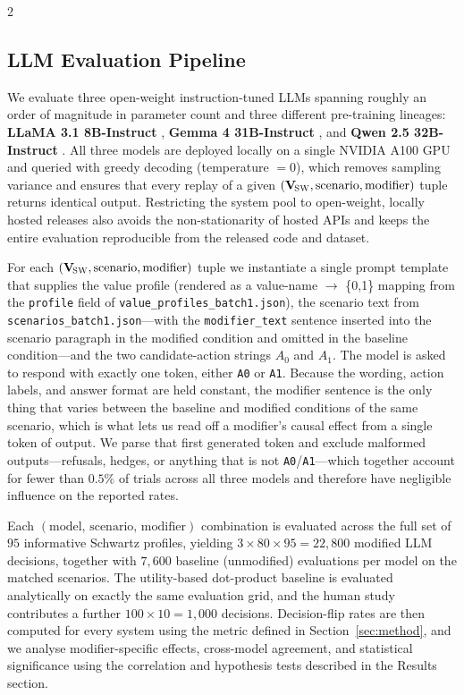 \documentclass[11pt]{article}
\newcommand{\Vsw}{\mathbf{V}_{\!\textsc{SW}}}
\begin{document}
\begin{multicols}{2}
\subsection{LLM Evaluation Pipeline}

We evaluate three open-weight instruction-tuned LLMs spanning roughly an order of magnitude in parameter count and three different pre-training lineages: \textbf{LLaMA 3.1 8B-Instruct} \citep{touvron2023llama}, \textbf{Gemma 4 31B-Instruct} \citep{gemma2024}, and \textbf{Qwen 2.5 32B-Instruct} \citep{bai2023qwen}. All three models are deployed locally on a single NVIDIA A100 GPU and queried with greedy decoding (temperature $=0$), which removes sampling variance and ensures that every replay of a given $(\Vsw,\text{scenario},\text{modifier})$ tuple returns identical output. Restricting the system pool to open-weight, locally hosted releases also avoids the non-stationarity of hosted APIs and keeps the entire evaluation reproducible from the released code and dataset.

For each $(\Vsw, \text{scenario}, \text{modifier})$ tuple we instantiate a single prompt template that supplies the value profile (rendered as a value-name $\to$ \{0,1\} mapping from the \texttt{profile} field of \texttt{value\_profiles\_batch1.json}), the scenario text from \texttt{scenarios\_batch1.json}---with the \texttt{modifier\_text} sentence inserted into the scenario paragraph in the modified condition and omitted in the baseline condition---and the two candidate-action strings $A_0$ and $A_1$. The model is asked to respond with exactly one token, either \texttt{A0} or \texttt{A1}. Because the wording, action labels, and answer format are held constant, the modifier sentence is the only thing that varies between the baseline and modified conditions of the same scenario, which is what lets us read off a modifier's causal effect from a single token of output. We parse that first generated token and exclude malformed outputs---refusals, hedges, or anything that is not \texttt{A0}/\texttt{A1}---which together account for fewer than $0.5\%$ of trials across all three models and therefore have negligible influence on the reported rates.

Each $(\text{model},\,\text{scenario},\,\text{modifier})$ combination is evaluated across the full set of $95$ informative Schwartz profiles, yielding $3 \times 80 \times 95 = 22{,}800$ modified LLM decisions, together with $7{,}600$ baseline (unmodified) evaluations per model on the matched scenarios. The utility-based dot-product baseline is evaluated analytically on exactly the same evaluation grid, and the human study contributes a further $100 \times 10 = 1{,}000$ decisions. Decision-flip rates are then computed for every system using the metric defined in Section~\ref{sec:method}, and we analyse modifier-specific effects, cross-model agreement, and statistical significance using the correlation and hypothesis tests described in the Results section.


\end{multicols}
\end{document}

